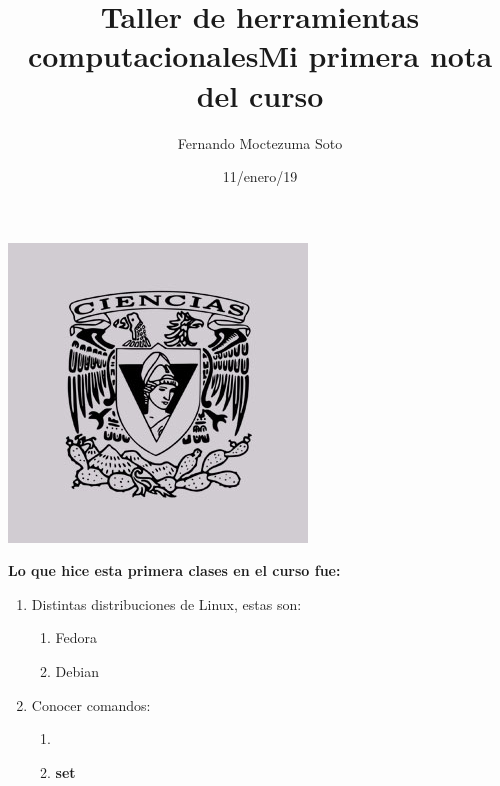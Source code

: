 \documentclass[etterpaper, 12pt, oneside]{article}%
\title{\Huge Taller de herramientas computacionales}
\author{Fernando Moctezuma Soto}
\date{11/enero/19}
\begin{document}
	\maketitle
	\includegraphics[scale=0.40]{1.jpg}
	
	\newpage
	
	\title{\Huge Mi primera nota del curso\\}
	
	\textbf{Lo que hice esta primera clases en el curso fue:}
	
	\begin{enumerate}
		\item Distintas distribuciones de Linux, estas son:
		\begin{enumerate}
			\item Fedora
			\item Debian
		\end{enumerate}
		\item Conocer comandos:
		\begin{enumerate}
			\item\color{red}{set}
			\item\color{magenta}\textbf{set}
		\end{enumerate}
	\end{enumerate}
	
\end{document}
